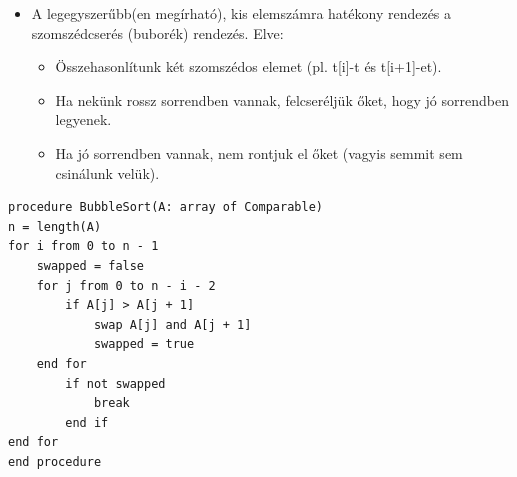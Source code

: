 \documentclass[11pt,a4paper]{article}
\begin{document}
            \begin{tcolorbox}[colback=blue!5!white,colframe=blue!50!black,title= 57. Ismertesse a szomszédcserés rendezés működését és komplexitását!]
                \begin{itemize}
                    \item A legegyszerűbb(en megírható), kis elemszámra hatékony rendezés a szomszédcserés (buborék) rendezés. Elve:
                    \begin{itemize}
                        
                        \item Összehasonlítunk két szomszédos elemet (pl. t[i]-t és t[i+1]-et).
                        \item Ha nekünk rossz sorrendben vannak, felcseréljük őket, hogy jó sorrendben legyenek.
                        \item Ha jó sorrendben vannak, nem rontjuk el őket (vagyis semmit sem csinálunk velük).
                    \end{itemize}
                \end{itemize}
                \begin{Verbatim}
procedure BubbleSort(A: array of Comparable)
n = length(A)
for i from 0 to n - 1
    swapped = false
    for j from 0 to n - i - 2
        if A[j] > A[j + 1]
            swap A[j] and A[j + 1]
            swapped = true
    end for
        if not swapped
            break
        end if
end for
end procedure                    
                \end{Verbatim}
            \end{tcolorbox}
\end{document}
